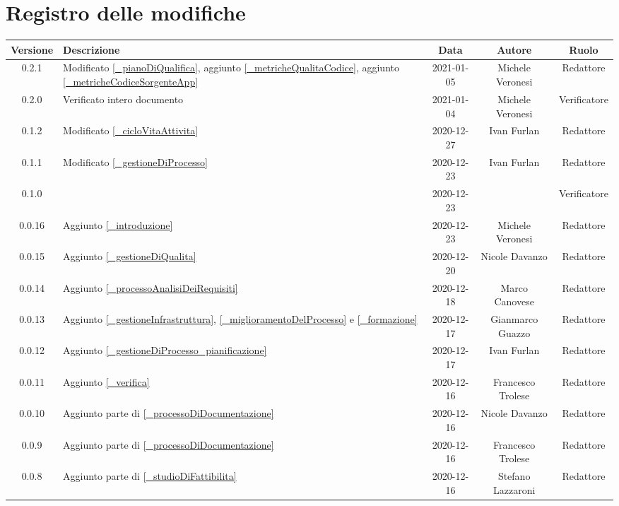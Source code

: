 \section*{Registro delle modifiche}

\begin{center}
	\begin{longtable}{|c|p{5cm}|c|c|c|}
		\hline
		\rowcolor{lighter-grayer}
		\textbf{Versione} & \textbf{Descrizione} & \textbf{Data} & \textbf{Autore} & \textbf{Ruolo} \\
		\hline
		\endfirsthead

		0.2.1 & Modificato \ref{_pianoDiQualifica}, aggiunto \ref{_metricheQualitaCodice}, aggiunto \ref{_metricheCodiceSorgenteApp} & 2021-01-05 & Michele Veronesi & Redattore \\
		0.2.0 & Verificato intero documento & 2021-01-04 & Michele Veronesi & Verificatore \\
		0.1.2 & Modificato \ref{_cicloVitaAttivita} & 2020-12-27& Ivan Furlan & Redattore \\
		0.1.1 & Modificato \ref{_gestioneDiProcesso} & 2020-12-23 & Ivan Furlan & Redattore \\
		0.1.0 &  & 2020-12-23 &  & Verificatore \\
		0.0.16 & Aggiunto \ref{_introduzione} & 2020-12-23 & Michele Veronesi & Redattore \\
		0.0.15 & Aggiunto \ref{_gestioneDiQualita} & 2020-12-20 & Nicole Davanzo & Redattore \\
		0.0.14 & Aggiunto \ref{_processoAnalisiDeiRequisiti} & 2020-12-18 & Marco Canovese & Redattore \\
		0.0.13 & Aggiunto \ref{_gestioneInfrastruttura}, \ref{_miglioramentoDelProcesso} e \ref{_formazione} & 2020-12-17 & Gianmarco Guazzo & Redattore \\
		0.0.12 & Aggiunto \ref{_gestioneDiProcesso_pianificazione} & 2020-12-17 & Ivan Furlan & Redattore \\
		0.0.11 & Aggiunto \ref{_verifica} & 2020-12-16 & Francesco Trolese & Redattore \\
		0.0.10 & Aggiunto parte di \ref{_processoDiDocumentazione} & 2020-12-16 & Nicole Davanzo & Redattore \\
		0.0.9 & Aggiunto parte di \ref{_processoDiDocumentazione} & 2020-12-16 & Francesco Trolese & Redattore \\
		0.0.8 & Aggiunto parte di \ref{_studioDiFattibilita} & 2020-12-16 & Stefano Lazzaroni & Redattore \\

\end{longtable}
\end{center}

